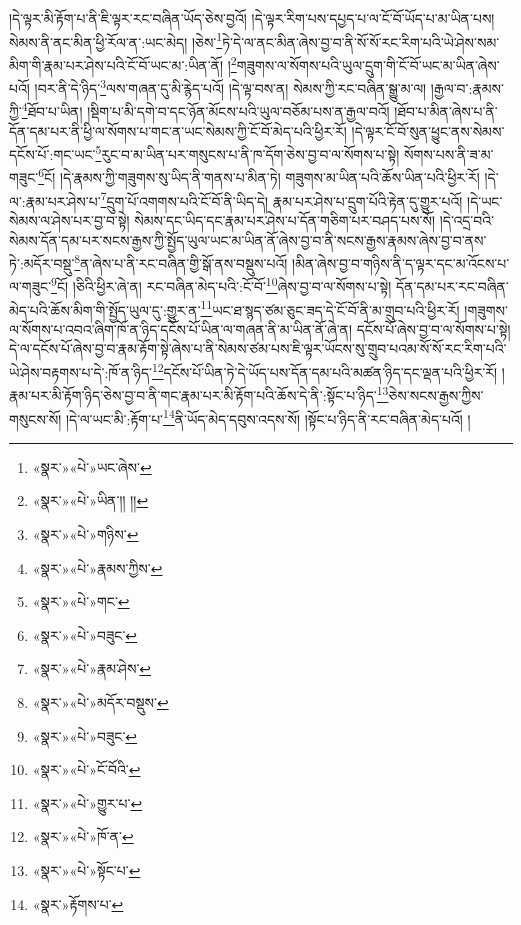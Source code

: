 །དེ་ལྟར་མི་རྟོག་པ་ནི་ཇི་ལྟར་རང་བཞིན་ཡོད་ཅེས་བྱའོ། །དེ་ལྟར་རིག་པས་དཔྱད་པ་ལ་ངོ་བོ་ཡོད་པ་མ་ཡིན་པས། སེམས་ནི་ནང་མིན་ཕྱི་རོལ་ན་:ཡང་མེད། །ཅེས་\footnote{«སྣར་»«པེ་»ཡང་ཞེས་}ཏེ་དེ་ལ་ནང་མིན་ཞེས་བྱ་བ་ནི་སོ་སོ་རང་རིག་པའི་ཡེ་ཤེས་སམ་མིག་གི་རྣམ་པར་ཤེས་པའི་ངོ་བོ་ཡང་མ་:ཡིན་ནོ། །\footnote{«སྣར་»«པེ་»ཡིན་།། །།}གཟུགས་ལ་སོགས་པའི་ཡུལ་དྲུག་གི་ངོ་བོ་ཡང་མ་ཡིན་ཞེས་པའོ། །བར་ནི་དེ་ཉིད་\footnote{«སྣར་»«པེ་»གཉིས་}ལས་གཞན་དུ་མི་རྙེད་པའོ། །དེ་ལྟ་བས་ན། སེམས་ཀྱི་རང་བཞིན་སྒྱུ་མ་ལ། །རྒྱལ་བ་:རྣམས་ཀྱི་\footnote{«སྣར་»«པེ་»རྣམས་ཀྱིས་}ཐོབ་པ་ཡིན། །སྡིག་པ་མི་དགེ་བ་དང་ཉོན་མོངས་པའི་ཡུལ་བཅོམ་པས་ན་རྒྱལ་བའོ། །ཐོབ་པ་མིན་ཞེས་པ་ནི་དོན་དམ་པར་ནི་ཕྱི་ལ་སོགས་པ་གང་ན་ཡང་སེམས་ཀྱི་ངོ་བོ་མེད་པའི་ཕྱིར་རོ། །དེ་ལྟར་ངོ་བོ་སུན་ཕྱུང་ནས་སེམས་དངོས་པོ་:གང་ཡང་\footnote{«སྣར་»«པེ་»གང་}རུང་བ་མ་ཡིན་པར་གསུངས་པ་ནི་ཁ་དོག་ཅེས་བྱ་བ་ལ་སོགས་པ་སྟེ། སོགས་པས་ནི་ཟ་མ་གཟུང་\footnote{«སྣར་»«པེ་»བཟུང་}ངོ། །དེ་རྣམས་ཀྱི་གཟུགས་སུ་ཡིད་ནི་གནས་པ་མིན་ཏེ། གཟུགས་མ་ཡིན་པའི་ཆོས་ཡིན་པའི་ཕྱིར་རོ། །དེ་ལ་:རྣམ་པར་ཤེས་པ་\footnote{«སྣར་»«པེ་»རྣམ་ཤེས་}དྲུག་པོ་འགགས་པའི་ངོ་བོ་ནི་ཡིད་དེ། རྣམ་པར་ཤེས་པ་དྲུག་པོའི་རྟེན་དུ་གྱུར་པའོ། །དེ་ཡང་སེམས་ལ་ཤེས་པར་བྱ་བ་སྟེ། སེམས་དང་ཡིད་དང་རྣམ་པར་ཤེས་པ་དོན་གཅིག་པར་བཤད་པས་སོ། །དེ་འདྲ་བའི་སེམས་དོན་དམ་པར་སངས་རྒྱས་ཀྱི་སྤྱོད་ཡུལ་ཡང་མ་ཡིན་ནོ་ཞེས་བྱ་བ་ནི་སངས་རྒྱས་རྣམས་ཞེས་བྱ་བ་ནས་ཏེ་:མདོར་བསྡུ་\footnote{«སྣར་»«པེ་»མདོར་བསྡུས་}ན་ཞེས་པ་ནི་རང་བཞིན་གྱི་སྒོ་ནས་བསྡུས་པའོ། །མིན་ཞེས་བྱ་བ་གཉིས་ནི་ད་ལྟར་དང་མ་འོངས་པ་ལ་གཟུང་\footnote{«སྣར་»«པེ་»བཟུང་}ངོ། །ཅིའི་ཕྱིར་ཞེ་ན། རང་བཞིན་མེད་པའི་:ངོ་བོ་\footnote{«སྣར་»«པེ་»ངོ་བོའི་}ཞེས་བྱ་བ་ལ་སོགས་པ་སྟེ། དོན་དམ་པར་རང་བཞིན་མེད་པའི་ཆོས་མིག་གི་སྤྱོད་ཡུལ་དུ་:གྱུར་ན་\footnote{«སྣར་»«པེ་»གྱུར་པ་}ཡང་ཐ་སྙད་ཙམ་ཅུང་ཟད་དེ་ངོ་བོ་ནི་མ་གྲུབ་པའི་ཕྱིར་རོ། །གཟུགས་ལ་སོགས་པ་འབའ་ཞིག་ཁོ་ན་ཉིད་དངོས་པོ་ཡིན་ལ་གཞན་ནི་མ་ཡིན་ནོ་ཞེ་ན། དངོས་པོ་ཞེས་བྱ་བ་ལ་སོགས་པ་སྟེ། དེ་ལ་དངོས་པོ་ཞེས་བྱ་བ་རྣམ་རྟོག་སྟེ་ཞེས་པ་ནི་སེམས་ཙམ་པས་ཇི་ལྟར་ཡོངས་སུ་གྲུབ་པའམ་སོ་སོ་རང་རིག་པའི་ཡེ་ཤེས་བརྟགས་པ་དེ་:ཁོ་ན་ཉིད་\footnote{«སྣར་»«པེ་»ཁོ་ན་}དངོས་པོ་ཡིན་ཏེ་དེ་ཡོད་པས་དོན་དམ་པའི་མཚན་ཉིད་དང་ལྡན་པའི་ཕྱིར་རོ། །རྣམ་པར་མི་རྟོག་ཉིད་ཅེས་བྱ་བ་ནི་གང་རྣམ་པར་མི་རྟོག་པའི་ཆོས་དེ་ནི་:སྟོང་པ་ཉིད་\footnote{«སྣར་»«པེ་»སྟོང་པ་}ཅེས་སངས་རྒྱས་ཀྱིས་གསུངས་སོ། །དེ་ལ་ཡང་མི་:རྟོག་པ་\footnote{«སྣར་»རྟོགས་པ་}ནི་ཡོད་མེད་དབུས་འདས་སོ། །སྟོང་པ་ཉིད་ནི་རང་བཞིན་མེད་པའོ། །
